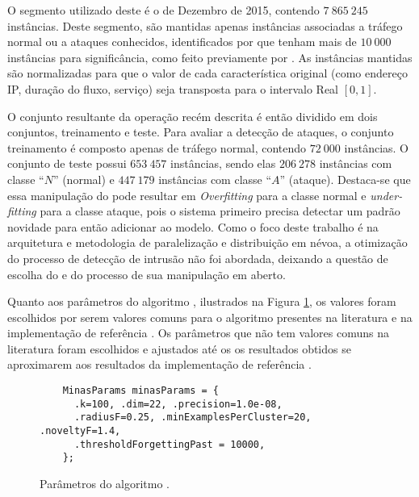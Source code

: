 O segmento utilizado deste \dataset é o de Dezembro de 2015, contendo $7\:865\:245$ instâncias.
Deste segmento, são mantidas apenas instâncias associadas a tráfego normal ou
a ataques conhecidos, identificados por \nids que tenham mais de $10\:000$ instâncias
para significância, como feito previamente por .
As instâncias mantidas são normalizadas para que o valor de cada característica
original (como endereço IP, duração do fluxo, serviço) seja transposta para o
intervalo Real $[0, 1]$.

O conjunto resultante da operação recém descrita é então dividido em dois
conjuntos, treinamento e teste.
Para avaliar a detecção de ataques, o conjunto treinamento é composto apenas de
tráfego normal, contendo $72\:000$ instâncias.
O conjunto de teste possui $653\:457$ instâncias, sendo elas
$206\:278$ instâncias com classe ``$N$'' (normal) e
$447\:179$ instâncias com classe ``$A$'' (ataque).
%
Destaca-se que essa manipulação do \dataset pode resultar em \emph{Overfitting} para a classe
normal e \emph{under-fitting} para a classe ataque, pois o sistema primeiro
precisa detectar um padrão novidade para então adicionar ao modelo. 
Como o foco deste trabalho é na arquitetura e metodologia de paralelização e
distribuição em névoa, a otimização do processo de detecção de intrusão não foi
abordada, deixando a questão de escolha do \dataset e do processo de sua manipulação
 em aberto.

Quanto aos parâmetros do algoritmo \minas, ilustrados na Figura
\ref{fig:params}, os valores foram escolhidos por serem valores comuns para o
algoritmo presentes na literatura \cite{Faria2013Minas,Faria2016minas} e na
implementação de referência  \cite{Faria2013source}.
Os parâmetros que não tem valores comuns na literatura foram escolhidos e ajustados até os
os resultados obtidos se aproximarem aos resultados da implementação de referência .

\begin{figure}[htb]
  \centering
  \begin{lstlisting}
    MinasParams minasParams = {
      .k=100, .dim=22, .precision=1.0e-08,
      .radiusF=0.25, .minExamplesPerCluster=20, .noveltyF=1.4,
      .thresholdForgettingPast = 10000,
    };
  \end{lstlisting}
  \caption{Parâmetros do algoritmo \minas.}
  \label{fig:params}
\end{figure}

